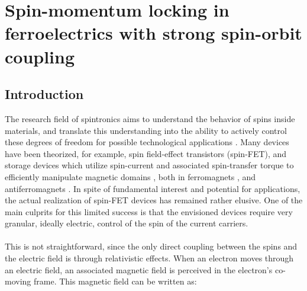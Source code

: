 \newcommand{\Unkr}{u_n(\bm{k}, \bm{r})}
\newcommand{\Eikr}{e^{i\bm{k}\cdot\bm{r}}}
\chapter{Spin-momentum locking in ferroelectrics with strong spin-orbit coupling\label{ch:Rashba}}
\section{Introduction}
%
The research field of spintronics aims to understand the behavior of spins inside materials, and translate this understanding into the ability to actively control these degrees of freedom for possible technological applications \cite{Joshi2016}.
Many devices have been theorized, for example, spin field-effect transistors (spin-FET)\cite{Datta1990}, and storage devices  which utilize spin-current and associated spin-transfer torque to efficiently manipulate magnetic domains \cite{Kent2015}, both in ferromagnets \cite{Nunez2011}, and antiferromagnets \cite{Nunez2006TheorySemiconductors,Nunez2006TheoryMetals, Jungwirth2016}.
In spite of fundamental interest and potential for applications, the actual realization of spin-FET devices has remained rather elusive.
One of the main culprits for this limited success is that the envisioned devices require very granular, ideally electric, control of the spin of the current carriers.
\\\\
This is not straightforward, since the only direct coupling between the spins and the electric field is through relativistic effects. When an electron moves through an electric field, an associated magnetic field is perceived in the electron's co-moving frame. This magnetic field can be written as:

